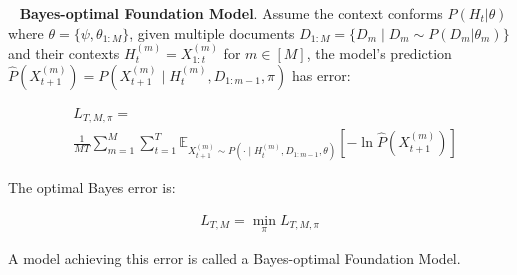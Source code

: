     \begin{definition}~\cite{JeonLLR24}
    \textbf{Bayes-optimal Foundation Model}. Assume the context conforms \( P(H_t|\theta) \) where \(\theta = \{\psi, \theta_{1:M}\}\), given multiple documents \( D_{1:M} = \{ D_m \mid D_m \sim P(D_m|\theta_m) \} \) and their contexts \( H_t^{(m)} = X_{1:t}^{(m)} \) for \( m \in [M] \), the model's prediction \( \hat P(X_{t+1}^{(m)}) = P(X_{t+1}^{(m)} \mid H_t^{(m)}, D_{1:m-1}, \pi) \) has error:
    
    \begin{equation}
    \begin{aligned}
        & L_{T,M,\pi} = \\
        & \frac{1}{MT} \sum_{m=1}^{M} \sum_{t=1}^{T} \mathbb{E}_{X_{t+1}^{(m)} \sim P(\cdot \mid H_t^{(m)}, D_{1:m-1}, \theta)} \left[ -\ln \hat P(X_{t+1}^{(m)}) \right]
    \end{aligned}
    \end{equation}
    
    The optimal Bayes error is:

    \begin{equation}
        \begin{aligned}
            L_{T,M} = \min_{\pi} L_{T,M,\pi}
        \end{aligned}
    \end{equation}
    
    
    A model achieving this error is called a Bayes-optimal Foundation Model.
    \end{definition}
    
